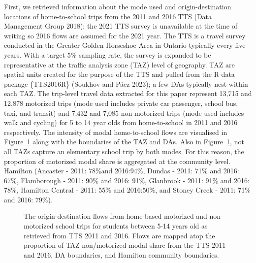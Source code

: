 \documentclass[
default
]{sn-jnl}
\begin{document}
First, we retrieved information about the mode used and
origin-destination locations of home-to-school trips from the 2011 and
2016 TTS (Data Management Group 2018); the 2021 TTS survey is
unavailable at the time of writing so 2016 flows are assumed for the
2021 year. The TTS is a travel survey conducted in the Greater Golden
Horseshoe Area in Ontario typically every five years. With a target 5\%
sampling rate, the survey is expanded to be representative at the
traffic analysis zone (TAZ) level of geography. TAZ are spatial units
created for the purpose of the TTS and pulled from the R data package
\{TTS2016R\} (Soukhov and Páez 2023); a few DAs typically nest within
each TAZ. The trip-level travel data extracted for this paper represent
13,715 and 12,878 motorized trips (mode used includes private car
passenger, school bus, taxi, and transit) and 7,432 and 7,085
non-motorized trips (mode used includes walk and cycling) for 5 to 14
year olds from home-to-school in 2011 and 2016 respectively. The
intensity of modal home-to-school flows are visualised in
Figure~\ref{fig-Fig4} along with the boundaries of the TAZ and DAs. Also
in Figure~\ref{fig-Fig4}, not all TAZs capture an elementary school trip
by both modes. For this reason, the proportion of motorized modal share
is aggregated at the community level. Hamilton (Ancaster - 2011: 78\%and
2016:94\%, Dundas - 2011: 71\% and 2016: 67\%, Flamborough - 2011: 90\%
and 2016: 91\%, Glanbrook - 2011: 91\% and 2016: 78\%, Hamilton Central
- 2011: 55\% and 2016:50\%, and Stoney Creek - 2011: 71\% and 2016:
79\%).

\begin{figure}[H]


\caption{\label{fig-Fig4}The origin-destination flows from home-based
motorized and non-motorized school trips for students between 5-14 years
old as retrieved from TTS 2011 and 2016. Flows are mapped atop the
proportion of TAZ non/motorized modal share from the TTS 2011 and 2016,
DA boundaries, and Hamilton community boundaries.}

\end{figure}%
\end{document}
